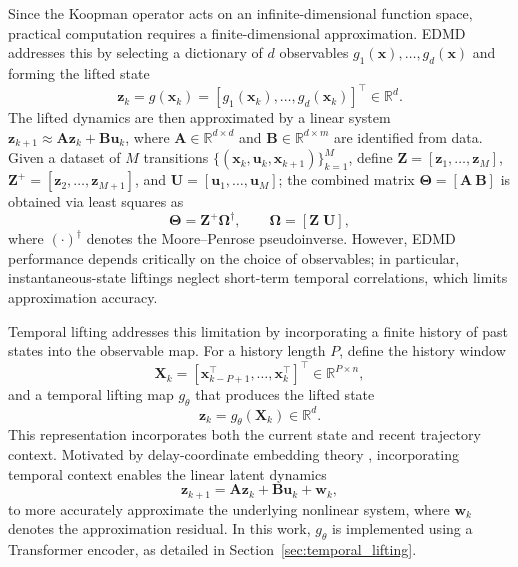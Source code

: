 \documentclass[journal]{IEEEtran}
\newcommand{\vx}{\mathbf{x}}
\newcommand{\vu}{\mathbf{u}}
\newcommand{\vz}{\mathbf{z}}
\newcommand{\vw}{\mathbf{w}}
\newcommand{\mA}{\mathbf{A}}
\newcommand{\mB}{\mathbf{B}}
\newcommand{\mX}{\mathbf{X}}
\newcommand{\mZ}{\mathbf{Z}}
\newcommand{\mU}{\mathbf{U}}
\newcommand{\mTheta}{\boldsymbol{\Theta}}
\newcommand{\mOmega}{\boldsymbol{\Omega}}
\begin{document}
Since the Koopman operator acts on an infinite-dimensional function space, practical computation requires a finite-dimensional approximation. EDMD addresses this by selecting a dictionary of $d$ observables $g_1(\vx),\ldots,g_d(\vx)$ and forming the lifted state
\begin{equation}
    \vz_k = g(\vx_k) = [g_1(\vx_k), \ldots, g_d(\vx_k)]^\top \in \mathbb{R}^d.
    \label{eq:instantaneous_lifting}
\end{equation}
The lifted dynamics are then approximated by a linear system $\vz_{k+1} \approx \mA \vz_k + \mB \vu_k$, where $\mA \in \mathbb{R}^{d \times d}$ and $\mB \in \mathbb{R}^{d \times m}$ are identified from data. Given a dataset of $M$ transitions $\{(\vx_k, \vu_k, \vx_{k+1})\}_{k=1}^M$, define $\mZ = [\vz_1,\ldots,\vz_M]$, $\mZ^+ = [\vz_2,\ldots,\vz_{M+1}]$, and $\mU = [\vu_1,\ldots,\vu_M]$; the combined matrix $\mTheta = [\mA\ \mB]$ is obtained via least squares as
\begin{equation}
    \mTheta = \mZ^+ \mOmega^\dagger, \qquad \mOmega = [\mZ\; \mU],
    \label{eq:edmd_regression}
\end{equation}
where $(\cdot)^\dagger$ denotes the Moore--Penrose pseudoinverse. However, EDMD performance depends critically on the choice of observables; in particular, instantaneous-state liftings neglect short-term temporal correlations, which limits approximation accuracy.

Temporal lifting addresses this limitation by incorporating a finite history of past states into the observable map. For a history length $P$, define the history window
\begin{equation}
    \mX_k = [\vx_{k-P+1}^\top, \ldots, \vx_k^\top]^\top \in \mathbb{R}^{P\times n},
    \label{eq:history_window}
\end{equation}
and a temporal lifting map $g_\theta$ that produces the lifted state
\begin{equation}
    \vz_k = g_\theta(\mX_k) \in \mathbb{R}^d.
    \label{eq:temporal_lifting}
\end{equation}
This representation incorporates both the current state and recent trajectory context. Motivated by delay-coordinate embedding theory \cite{arbabi2017ergodic, rank2019recurrent}, incorporating temporal context enables the linear latent dynamics
\begin{equation}
    \vz_{k+1} = \mA \vz_k + \mB \vu_k + \vw_k,
    \label{eq:lifted_dynamics_prelim}
\end{equation}
to more accurately approximate the underlying nonlinear system, where $\vw_k$ denotes the approximation residual. In this work, $g_\theta$ is implemented using a Transformer encoder, as detailed in Section~\ref{sec:temporal_lifting}.
\end{document}
